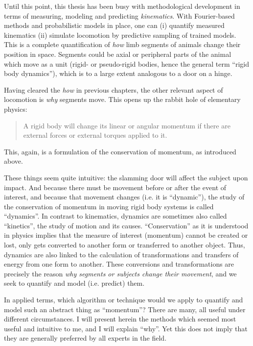 Until this point, this thesis has been busy with methodological development in terms of measuring, modeling and predicting \emph{kinematics}.
With Fourier-based methods and probabilistic models in place, one can
  (i) quantify measured kinematics
  (ii) simulate locomotion by predictive sampling of trained models.
This is a complete quantification of \emph{how} limb segments of animals change their position in space.
Segments could be axial or peripheral parts of the animal which move as a unit (rigid- or pseudo-rigid bodies, hence the general term ``rigid body dynamics''), which is to a large extent analogous to a door on a hinge.

Having cleared the \emph{how} in previous chapters, the other relevant aspect of locomotion is \emph{why} segments move.
This opens up the rabbit hole of elementary physics:
\begin{quote}
A rigid body will change its linear or angular momentum if there are external forces or external torques applied to it.
\end{quote}
This, again, is a formulation of the conservation of momentum, as introduced above.

These things seem quite intuitive: the slamming door will affect the subject upon impact.
And because there must be movement before or after the event of interest, and because that movement changes (i.e. it is ``dynamic''), the study of the conservation of momentum in moving rigid body systems is called ``dynamics''.
In contrast to kinematics, dynamics are sometimes also called ``kinetics'', the study of motion and its causes.
``Conservation'' as it is understood in physics implies that the measure of interest (momentum) cannot be created or lost, only gets converted to another form or transferred to another object.
Thus, dynamics are also linked to the calculation of transformations and transfers of energy from one form to another.
These conversions and transformations are precisely the reason \emph{why segments or subjects change their movement}, and we seek to quantify and model (i.e. predict) them.


In applied terms, which algorithm or technique would we apply to quantify and model such an abstract thing as ``momentum''?
There are many, all useful under different circumstances.
I will present herein the methods which seemed most useful and intuitive to me, and I will explain ``why''.
Yet this does not imply that they are generally preferred by all experts in the field.

